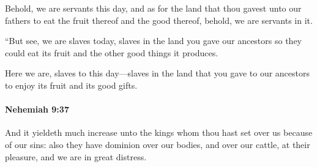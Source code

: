			\begin{versebox}
					\item[BHS] 
					\item[LXX] 
					\item[ASV] Behold, we are servants this day, and as for the land that thou gavest unto our fathers to eat the fruit thereof and the good thereof, behold, we are servants in it.
					\item[NIV] “But see, we are slaves today, slaves in the land you gave our ancestors so they could eat its fruit and the other good things it produces.
					\item[NRSV] Here we are, slaves to this day—slaves in the land that you gave to our ancestors to enjoy its fruit and its good gifts.
			\end{versebox}

		\paragraph{Nehemiah 9:37} %
			\label{NEHEMIAH-9-37}

			And it yieldeth much increase unto the kings whom thou hast set over us because of our sins: also they have dominion over our bodies, and over our cattle, at their pleasure, and we are in great distress.


